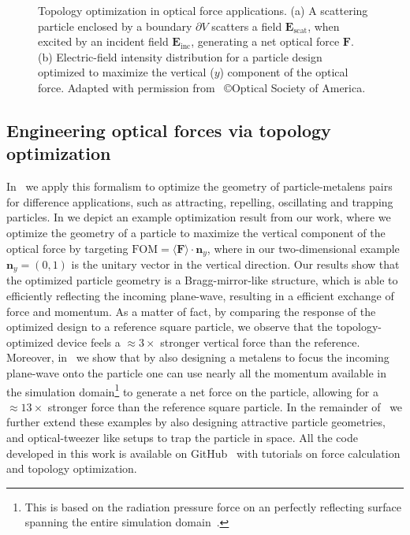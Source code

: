 \begin{figure}[tb]
    \centering
    \caption{Topology optimization in optical force applications. (a) A scattering particle 
    enclosed by a boundary $\partial V$ scatters a field $\mathbf{E}_\text{scat}$, when excited by an incident field $\mathbf{E}_\text{inc}$, 
    generating a net optical force $\mathbf{F}$. (b) Electric-field intensity distribution for a particle design optimized to maximize the vertical ($y$)
    component of the optical force. Adapted with permission from~\cite{ownpub2} \copyright Optical Society of America.}
    \label{fig:eng_res}
\end{figure}

\subsection*{Engineering optical forces via topology optimization}

In~\cite{ownpub2} we apply this formalism to optimize the geometry of particle-metalens pairs for difference applications, such as attracting, repelling, 
oscillating and trapping particles. In  we depict an example optimization result from our work, where 
we optimize the geometry of a particle to maximize the vertical component of the optical force by targeting $\text{FOM} = \langle\mathbf{F}\rangle \cdot \mathbf{n}_y$, where
in our two-dimensional example $\mathbf{n}_y = (0, 1)$ is the unitary vector in the vertical direction.  Our results show that the optimized particle geometry is a Bragg-mirror-like
structure, which is able to efficiently reflecting the incoming plane-wave, resulting in a efficient exchange of force and momentum. As a matter of fact, by comparing the response of the optimized design
to a reference square particle, we observe that the topology-optimized device feels a $\approx 3\times$ stronger vertical force than the reference.
 Moreover, in~\cite{ownpub2} we show that by also designing a metalens to focus the incoming plane-wave onto the particle one can use nearly all the momentum available in the simulation domain\footnote{This is based on the radiation pressure force on an perfectly reflecting surface spanning the entire simulation domain~\cite{ownpub2}.} 
 to generate a net force on the particle, allowing for a $\approx 13\times$ stronger force than the reference square particle. 
 In the remainder of~\cite{ownpub2} we further extend these examples by also designing
attractive particle geometries, and optical-tweezer like setups to trap the particle in space. All the code developed in this work is available on GitHub~\cite{github_MST} with tutorials on force calculation and topology optimization. 

